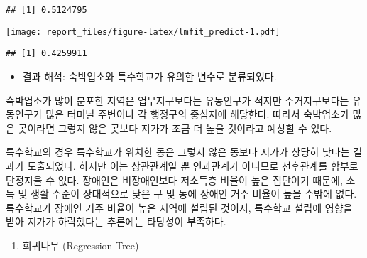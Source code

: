 \documentclass[]{article}
\newenvironment{Shaded}{\begin{snugshade}}{\end{snugshade}}
\newcommand{\DataTypeTok}[1]{\textcolor[rgb]{0.13,0.29,0.53}{#1}}
\newcommand{\DecValTok}[1]{\textcolor[rgb]{0.00,0.00,0.81}{#1}}
\newcommand{\KeywordTok}[1]{\textcolor[rgb]{0.13,0.29,0.53}{\textbf{#1}}}
\newcommand{\NormalTok}[1]{#1}
\newcommand{\OperatorTok}[1]{\textcolor[rgb]{0.81,0.36,0.00}{\textbf{#1}}}
\newcommand{\StringTok}[1]{\textcolor[rgb]{0.31,0.60,0.02}{#1}}
\providecommand{\tightlist}{%
  \setlength{\itemsep}{0pt}\setlength{\parskip}{0pt}}
\begin{document}
\begin{verbatim}
## [1] 0.5124795
\end{verbatim}

\begin{Shaded}
\end{Shaded}

\texttt{[image: report\_files/figure-latex/lmfit\_predict-1.pdf]}

\begin{Shaded}
\end{Shaded}

\begin{verbatim}
## [1] 0.4259911
\end{verbatim}

\begin{itemize}
\tightlist
\item
  결과 해석: 숙박업소와 특수학교가 유의한 변수로 분류되었다.
\end{itemize}

숙박업소가 많이 분포한 지역은 업무지구보다는 유동인구가 적지만
주거지구보다는 유동인구가 많은 터미널 주변이나 각 행정구의 중심지에
해당한다. 따라서 숙박업소가 많은 곳이라면 그렇지 않은 곳보다 지가가 조금
더 높을 것이라고 예상할 수 있다.

특수학교의 경우 특수학교가 위치한 동은 그렇지 않은 동보다 지가가 상당히
낮다는 결과가 도출되었다. 하지만 이는 상관관계일 뿐 인과관계가 아니므로
선후관계를 함부로 단정지을 수 없다. 장애인은 비장애인보다 저소득층
비율이 높은 집단이기 때문에, 소득 및 생활 수준이 상대적으로 낮은 구 및
동에 장애인 거주 비율이 높을 수밖에 없다. 특수학교가 장애인 거주 비율이
높은 지역에 설립된 것이지, 특수학교 설립에 영향을 받아 지가가 하락했다는
추론에는 타당성이 부족하다.

\begin{enumerate}
\def\labelenumi{\arabic{enumi})}
\setcounter{enumi}{2}
\tightlist
\item
  회귀나무 (Regression Tree)
\end{enumerate}
\end{document}
